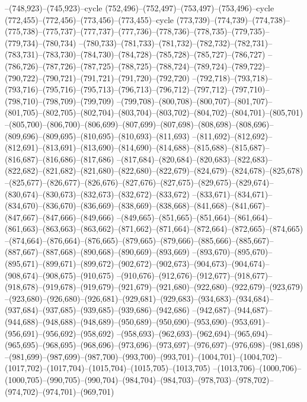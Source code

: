 --(748,923)--(745,923)--cycle
(752,496)--(752,497)--(753,497)--(753,496)--cycle
(772,455)--(772,456)--(773,456)--(773,455)--cycle
(773,739)--(774,739)--(774,738)--(775,738)--(775,737)--(777,737)--(777,736)--(778,736)--(778,735)--(779,735)--(779,734)--(780,734)
--(780,733)--(781,733)--(781,732)--(782,732)--(782,731)--(783,731)--(783,730)--(784,730)--(784,728)--(785,728)--(785,727)--(786,727)
--(786,726)--(787,726)--(787,725)--(788,725)--(788,724)--(789,724)--(789,722)--(790,722)--(790,721)--(791,721)--(791,720)--(792,720)
--(792,718)--(793,718)--(793,716)--(795,716)--(795,713)--(796,713)--(796,712)--(797,712)--(797,710)--(798,710)--(798,709)--(799,709)
--(799,708)--(800,708)--(800,707)--(801,707)--(801,705)--(802,705)--(802,704)--(803,704)--(803,702)--(804,702)--(804,701)--(805,701)
--(805,700)--(806,700)--(806,699)--(807,699)--(807,698)--(808,698)--(808,696)--(809,696)--(809,695)--(810,695)--(810,693)--(811,693)
--(811,692)--(812,692)--(812,691)--(813,691)--(813,690)--(814,690)--(814,688)--(815,688)--(815,687)--(816,687)--(816,686)--(817,686)
--(817,684)--(820,684)--(820,683)--(822,683)--(822,682)--(821,682)--(821,680)--(822,680)--(822,679)--(824,679)--(824,678)--(825,678)
--(825,677)--(826,677)--(826,676)--(827,676)--(827,675)--(829,675)--(829,674)--(830,674)--(830,673)--(832,673)--(832,672)--(833,672)
--(833,671)--(834,671)--(834,670)--(836,670)--(836,669)--(838,669)--(838,668)--(841,668)--(841,667)--(847,667)--(847,666)--(849,666)
--(849,665)--(851,665)--(851,664)--(861,664)--(861,663)--(863,663)--(863,662)--(871,662)--(871,664)--(872,664)--(872,665)--(874,665)
--(874,664)--(876,664)--(876,665)--(879,665)--(879,666)--(885,666)--(885,667)--(887,667)--(887,668)--(890,668)--(890,669)--(893,669)
--(893,670)--(895,670)--(895,671)--(899,671)--(899,672)--(902,672)--(902,673)--(904,673)--(904,674)--(908,674)--(908,675)--(910,675)
--(910,676)--(912,676)--(912,677)--(918,677)--(918,678)--(919,678)--(919,679)--(921,679)--(921,680)--(922,680)--(922,679)--(923,679)
--(923,680)--(926,680)--(926,681)--(929,681)--(929,683)--(934,683)--(934,684)--(937,684)--(937,685)--(939,685)--(939,686)--(942,686)
--(942,687)--(944,687)--(944,688)--(948,688)--(948,689)--(950,689)--(950,690)--(953,690)--(953,691)--(956,691)--(956,692)--(958,692)
--(958,693)--(962,693)--(962,694)--(965,694)--(965,695)--(968,695)--(968,696)--(973,696)--(973,697)--(976,697)--(976,698)--(981,698)
--(981,699)--(987,699)--(987,700)--(993,700)--(993,701)--(1004,701)--(1004,702)--(1017,702)--(1017,704)--(1015,704)--(1015,705)--(1013,705)
--(1013,706)--(1000,706)--(1000,705)--(990,705)--(990,704)--(984,704)--(984,703)--(978,703)--(978,702)--(974,702)--(974,701)--(969,701)
